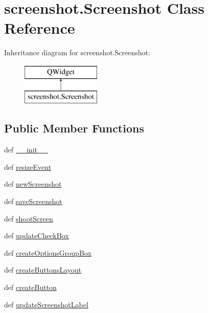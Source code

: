 \hypertarget{classscreenshot_1_1Screenshot}{}\section{screenshot.\+Screenshot Class Reference}
\label{classscreenshot_1_1Screenshot}
Inheritance diagram for screenshot.\+Screenshot\+:\begin{figure}[H]
\begin{center}
\leavevmode
\includegraphics[height=2.000000cm]{classscreenshot_1_1Screenshot}
\end{center}
\end{figure}
\subsection*{Public Member Functions}
\begin{DoxyCompactItemize}
\item 
def \hyperlink{classscreenshot_1_1Screenshot_a5f436c78e2dea990b8d30d51ec34bcc5}{\+\_\+\+\_\+init\+\_\+\+\_\+}
\item 
def \hyperlink{classscreenshot_1_1Screenshot_af617317f58c198b09793183e906288ea}{resize\+Event}
\item 
def \hyperlink{classscreenshot_1_1Screenshot_a553edb0fd37b9bd9573adb9a6c4dfa52}{new\+Screenshot}
\item 
def \hyperlink{classscreenshot_1_1Screenshot_a25b1cb4073d8926c26ae12a53402e79d}{save\+Screenshot}
\item 
def \hyperlink{classscreenshot_1_1Screenshot_a0c7ddb1b3b1157de047cec5be2c70c21}{shoot\+Screen}
\item 
def \hyperlink{classscreenshot_1_1Screenshot_a1541f37e866ae0faf4e53dc4fc99573b}{update\+Check\+Box}
\item 
def \hyperlink{classscreenshot_1_1Screenshot_a8a548af9ec135f3d93aab5f472a6095b}{create\+Options\+Group\+Box}
\item 
def \hyperlink{classscreenshot_1_1Screenshot_a86d9da10d945dbcb98d67e2d91f792e3}{create\+Buttons\+Layout}
\item 
def \hyperlink{classscreenshot_1_1Screenshot_a7df66480a72879177ce3fdffed99a9c6}{create\+Button}
\item 
def \hyperlink{classscreenshot_1_1Screenshot_aa16dcdccf7fa3cf318beb30a8d32a4e8}{update\+Screenshot\+Label}
\end{DoxyCompactItemize}
